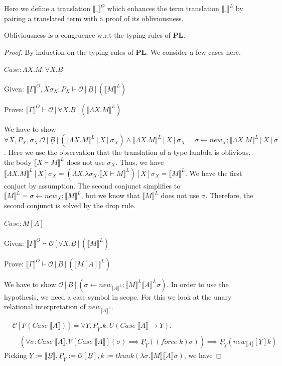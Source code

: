 \documentclass[acmsmall]{acmart}
\newcommand{\den}[1]{\llbracket #1\rrbracket}
\newcommand{\pl}{$\mathbf{PL}$}
\begin{document}
Here we define a translation $\den{\_}^O$ which enhances the term translation $\den{\_}^L$ by pairing a translated term with a proof of its obliviousness. 
\begin{theorem}
  Obliviousness is a congruence w.r.t the typing rules of \pl.
\end{theorem}
\begin{proof}
  By induction on the typing rules of $\mathbf{PL}$. We consider a few cases here.
  \paragraph{$Case: \Lambda X. M : \forall X. \underline{B}$}
  \indent

  \quad Given: $\den{\Gamma}^O,X\sigma_X;P_X \vdash \mathcal{O}[\underline{B}](\den{M}^L)$

  \quad Prove: $\den{\Gamma}^O \vdash \mathcal{O}[\forall X. \underline{B}](\den{\Lambda X. M}^L)$

  We have to show $\forall X,P_X,\sigma_X.\mathcal{O}[\underline{B}](\den{\Lambda X.M}^L[X]\sigma_X) \land \den{\Lambda X. M}^L[X]\sigma_X = \sigma \leftarrow new_X;\den{\Lambda X. M}^L[X]\sigma$.
  Here we use the observation that the translation of a type lambda is oblivious, the body $\den{X \vdash M}^L$ does not use $\sigma_X.$ Thus, we have $\den{\Lambda X. M}^L[X]\sigma_X = (\Lambda X.\lambda \sigma_X.\den{X \vdash M}^L)[X]\sigma_X = \den{M}^L$. We have the first conjuct by assumption. The second conjunct simplifies to $\den{M}^L = \sigma \leftarrow new_X; \den{M}^L$, but we know that $\den{M}^L$ does not use $\sigma$. Therefore, the second conjunct is solved by the drop rule.

  \paragraph{$Case: M[A]$}
  \indent

  \quad Given: $\den{\Gamma}^O \vdash \mathcal{O}[\forall X. \underline{B}](\den{M}^L)$
  
  \quad Prove: $\den{\Gamma}^O \vdash \mathcal{O}[\underline{B}](\den{M[A]}^L)$

  We have to show $\mathcal{O}[\underline{B}](\sigma \leftarrow new_{\den{A}^L};\den{M}^L\den{A}^L\sigma)$. In order to use the hypothesis, we need a case symbol in scope. For this we look at the unary relational interpretation of $new_{\den{A}^L}$.

  \begin{align*}
    &\mathcal{C}[F(Case\;\den{A})] = \forall \underline{Y},\underline{P}_{\underline{Y}}.k : U(Case\; \den{A} \to \underline{Y}). \\
    &\quad(\forall \sigma : Case\;\den{A}. \mathcal{V}[Case\;\den{A}](\sigma) \implies \underline{P}_{\underline{Y}}((force\;k)\sigma)) \implies \underline{P}_{\underline{Y}}(new_{\den{A}}[\underline{Y}]k) 
  \end{align*}
Picking $\underline{Y}:=\den{\underline{B}},\underline{P}_{\underline{Y}} := \mathcal{O}[\underline{B}],k:= thunk(\lambda \sigma. \den{M}\den{A}\sigma)$, we have


\end{proof}
\end{document}
